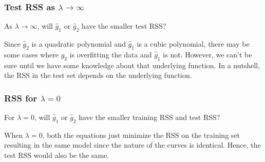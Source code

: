 \documentclass{article}
\begin{document}
\subsubsection{Test RSS as $\lambda \to \infty$}

\question
As $\lambda \to \infty$, will $\hat{g}_1$ or $\hat{g}_2$ have the smaller test RSS?

\answer
Since $\hat{g}_2$ is a quadratic polynomial and $\hat{g}_1$ is a cubic polynomial, there may be some cases where $\hat{g}_2$ is overfitting the data and $\hat{g}_1$ is not.
However, we can't be sure until we have some knowledge about that underlying function. In a nutshell, the RSS in the test set depends on the underlying function.

\subsubsection{RSS for $\lambda = 0$}

\question
For $\lambda = 0$, will $\hat{g}_1$ or $\hat{g}_2$ have the smaller training RSS and test RSS?

\answer
When $\lambda = 0$, both the equations just minimize the RSS on the training set resulting in the same model since the nature of the curves is identical.
Hence, the test RSS would also be the same.


\clearpage

% 
% 

\end{document}
